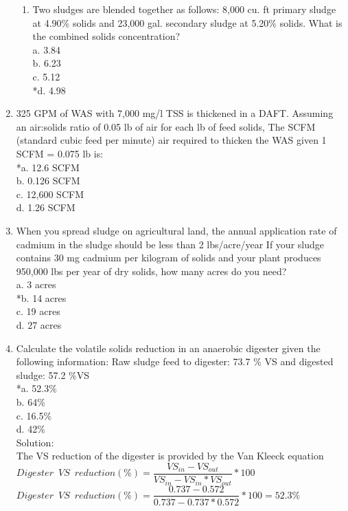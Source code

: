\documentclass{article}
\begin{document}
\begin{enumerate}
\begin{enumerate}
\item Two sludges are blended together as follows: 8,000 cu. ft primary sludge at 4.90\% solids and 23,000 gal. secondary sludge at 5.20\% solids. What is the combined solids concentration?\\
a. 3.84\\ 
b. 6.23 \\
c. 5.12 \\
*d. 4.98 \\

\end{enumerate}

\item 325 GPM of WAS with 7,000 mg/l TSS is thickened in a DAFT. Assuming an air:solids ratio of 0.05 lb of air for each lb of feed solids, The SCFM (standard cubic feed per minute) air required to thicken the WAS given 1 SCFM = 0.075 lb is: \\

*a. 12.6 SCFM \\
b. 0.126 SCFM \\
c. 12,600 SCFM \\
d. 1.26 SCFM \\

\item When you spread sludge on agricultural land, the annual application rate of cadmium in the sludge should be less than 2 lbs/acre/year If your sludge contains 30 mg cadmium per kilogram of solids and your plant produces 950,000 lbs per year of dry solids, how many acres do you need? \\

a. 3 acres\\
*b. 14 acres \\
c. 19 acres \\
d. 27 acres \\

\item Calculate the volatile solids reduction in an anaerobic digester given the following information: Raw sludge feed to digester: 73.7 \% VS and digested sludge: 57.2 \%VS\\

*a. 52.3\% \\
b. 64\%\\
c. 16.5\% \\
d. 42\% \\
\vspace{0.5cm}
Solution:\\
\vspace{0.5cm}  
The VS reduction of the digester is provided by the Van Kleeck equation \\ 
\vspace{0.5cm}
$Digester \enspace VS \enspace reduction (\%)=\dfrac{VS_{in}-VS_{out}}{VS_{in}-VS_{in}*VS_{out}}*100$\\
\vspace{0.5cm}
$Digester \enspace VS \enspace reduction (\%)=\dfrac{0.737-0.572}{0.737-0.737*0.572}*100=\boxed{ 52.3\%}$\\






\end{enumerate}
\end{document}
